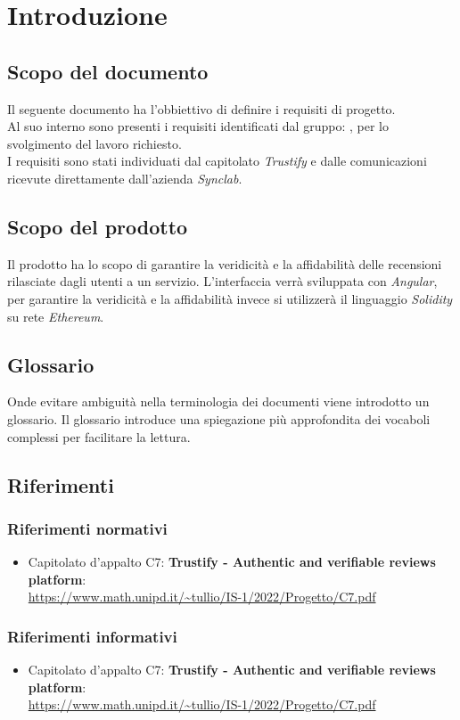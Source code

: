 \section{Introduzione}


\subsection{Scopo del documento}
Il seguente documento ha l'obbiettivo di definire i requisiti di progetto. \\ Al suo interno sono presenti i requisiti 
identificati dal gruppo: \groupName, per lo svolgimento del lavoro richiesto. \\ I requisiti sono stati individuati dal capitolato \textit{Trustify}
e dalle comunicazioni ricevute direttamente dall'azienda \textit{Synclab}.

\subsection{Scopo del prodotto}
Il prodotto ha lo scopo di garantire la veridicità e la affidabilità 
delle recensioni rilasciate dagli utenti a un servizio. L'interfaccia verrà
sviluppata con \textit{Angular}, per garantire la veridicità e la affidabilità 
invece si utilizzerà il linguaggio \textit{Solidity} su rete \textit{Ethereum}.


\subsection{Glossario}
Onde evitare ambiguità nella terminologia dei documenti viene introdotto un glossario.
Il glossario introduce una spiegazione più approfondita dei vocaboli complessi 
per facilitare la lettura.

\subsection{Riferimenti}
    \subsubsection{Riferimenti normativi}
        \begin{itemize}
            \item Capitolato d'appalto C7: \textbf{Trustify - Authentic and verifiable reviews platform}: \\
            \url{https://www.math.unipd.it/~tullio/IS-1/2022/Progetto/C7.pdf}
        \end{itemize}
    \subsubsection{Riferimenti informativi}
    \begin{itemize}
        \item Capitolato d'appalto C7: \textbf{Trustify - Authentic and verifiable reviews platform}: \\
        \url{https://www.math.unipd.it/~tullio/IS-1/2022/Progetto/C7.pdf}
    \end{itemize}